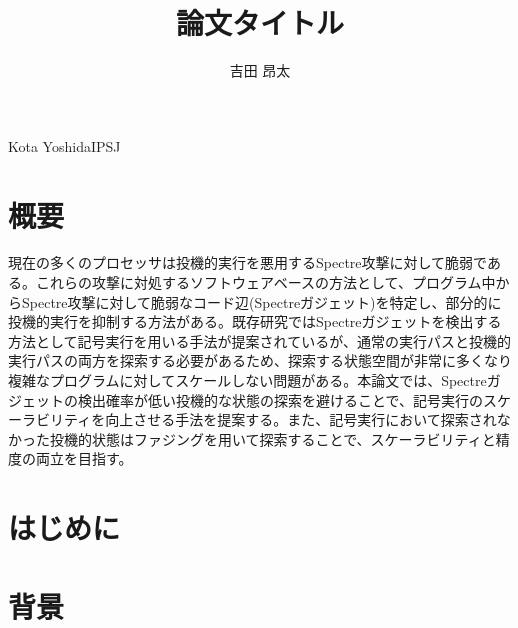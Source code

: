 \documentclass[submit]{ipsj}
\begin{document}
\title{論文タイトル}

\author{吉田 昂太}{Kota Yoshida}{IPSJ}



\maketitle

\section{概要}
現在の多くのプロセッサは投機的実行を悪用するSpectre攻撃に対して脆弱である。これらの攻撃に対処するソフトウェアベースの方法として、プログラム中からSpectre攻撃に対して脆弱なコード辺(Spectreガジェット)を特定し、部分的に投機的実行を抑制する方法がある。既存研究ではSpectreガジェットを検出する方法として記号実行を用いる手法が提案されているが、通常の実行パスと投機的実行パスの両方を探索する必要があるため、探索する状態空間が非常に多くなり複雑なプログラムに対してスケールしない問題がある。本論文では、Spectreガジェットの検出確率が低い投機的な状態の探索を避けることで、記号実行のスケーラビリティを向上させる手法を提案する。また、記号実行において探索されなかった投機的状態はファジングを用いて探索することで、スケーラビリティと精度の両立を目指す。

\section{はじめに}

\section{背景}
\end{document}
